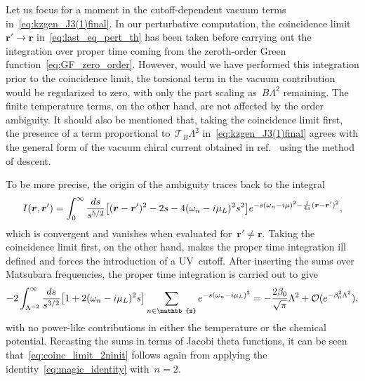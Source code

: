 \documentclass[11pt,a4paper]{article}
\begin{document}
Let us focus for a moment in the cutoff-dependent vacuum terms in~\eqref{eq:kzgen_J3(1)final}. 
In our perturbative computation, the
coincidence limit~$\boldsymbol{r}'\rightarrow \boldsymbol{r}$ 
in~\eqref{eq:last_eq_pert_th} has been taken before carrying out the integration over 
proper time coming from the zeroth-order Green function~\eqref{eq:GF_zero_order}.
However, would we have performed this integration prior to the coincidence limit, the torsional
term in the vacuum contribution would be regularized to zero, with only the part scaling
as~$B\Lambda^{2}$ remaining. The finite temperature terms, on the other hand, are
not affected by the order ambiguity. It should also be mentioned that,
taking the coincidence limit first, the presence of a
term proportional to~$\mathcal{T}_{B}\Lambda^{2}$ in~\eqref{eq:kzgen_J3(1)final}
agrees with the general form of the vacuum chiral
current obtained in ref.~\cite{Valle:2021nfv} using the 
method of descent.

To be more precise, the origin of the ambiguity traces back to the integral
\begin{align}
I(\boldsymbol{r},\boldsymbol{r}')
=\int_{0}^{\infty}{ds\over s^{5/2}}\big[(\boldsymbol{r}-\boldsymbol{r}')^{2}-2s-4(\omega_{n}-i\mu_{L})^{2}s^{2}\big]
e^{-s(\omega_{n}-i\mu)^{2}-{1\over 4s}(\boldsymbol{r}-\boldsymbol{r}')^{2}},
\label{eq:amb_iden_type}
\end{align}
which is convergent and 
vanishes when evaluated for~$\boldsymbol{r}'\neq\boldsymbol{r}$. 
Taking the coincidence limit first, on the other hand, makes the proper time integration ill
defined and forces 
the introduction of a UV~cutoff. After inserting the sums over Matsubara frequencies, the proper time
integration is carried out to give
\begin{align}
-2\int_{\Lambda^{-2}}^{\infty}{ds\over s^{3/2}}\big[1+2(\omega_{n}-i\mu_{L})^{2}s\big]
\sum_{n\in\mathbb{z}}e^{-s(\omega_{n}-i\mu_{L})^{2}}=-{2\beta_{0}\over\sqrt{\pi}}\Lambda^{2}
+\mathcal{O}(e^{-\beta_{0}^{2}\Lambda^{2}}),
\label{eq:coinc_limit_2ninit}
\end{align}
with no power-like contributions in either the temperature or the chemical potential. 
Recasting the sums in terms of
Jacobi theta functions, it can be seen that~\eqref{eq:coinc_limit_2ninit} follows again from applying
the identity~\eqref{eq:magic_identity} with~$n=2$.
\end{document}
